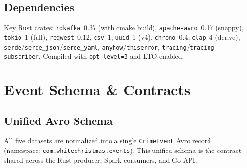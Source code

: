 \documentclass[12pt,a4paper]{article}
\begin{document}
\subsection{Dependencies}

Key Rust crates: \texttt{rdkafka}~0.37 (with cmake build), \texttt{apache-avro}~0.17 (snappy), \texttt{tokio}~1 (full), \texttt{reqwest}~0.12, \texttt{csv}~1, \texttt{uuid}~1 (v4), \texttt{chrono}~0.4, \texttt{clap}~4 (derive), \texttt{serde}/\texttt{serde\_json}/\texttt{serde\_yaml}, \texttt{anyhow}/\texttt{thiserror}, \texttt{tracing}/\texttt{tracing-subscriber}. Compiled with \texttt{opt-level=3} and LTO enabled.

\section{Event Schema \& Contracts}

\subsection{Unified Avro Schema}

All five datasets are normalized into a single \texttt{CrimeEvent} Avro record (namespace: \texttt{com.whitechristmas.events}). This unified schema is the contract shared across the Rust producer, Spark consumers, and Go API.
\end{document}
